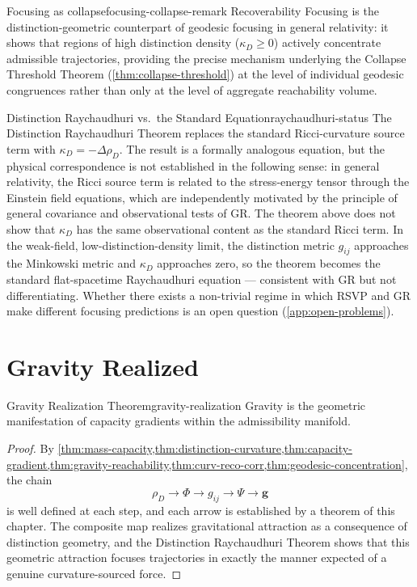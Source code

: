 \documentclass[12pt,twoside,openright]{book}
\begin{document}
\begin{remark}{Focusing as collapse}{focusing-collapse-remark}
  Recoverability Focusing is the distinction-geometric
  counterpart of geodesic focusing in general relativity: it
  shows that regions of high distinction density
  ($\kappa_D \ge 0$) actively concentrate admissible
  trajectories, providing the precise mechanism underlying
  the Collapse Threshold Theorem
  (\cref{thm:collapse-threshold}) at the level of individual
  geodesic congruences rather than only at the level of
  aggregate reachability volume.
\end{remark}

\begin{remark}{Distinction Raychaudhuri vs.\ the Standard
  Equation}{raychaudhuri-status}
  The Distinction Raychaudhuri Theorem replaces the
  standard Ricci-curvature source term with
  $\kappa_D = -\Delta\rho_D$. The result is a formally
  analogous equation, but the physical correspondence
  is not established in the following sense: in general
  relativity, the Ricci source term is related to the
  stress-energy tensor through the Einstein field equations,
  which are independently motivated by the principle of
  general covariance and observational tests of GR. The
  theorem above does not show that $\kappa_D$ has the same
  observational content as the standard Ricci term. In the
  weak-field, low-distinction-density limit, the
  distinction metric $g_{ij}$ approaches the Minkowski
  metric and $\kappa_D$ approaches zero, so the theorem
  becomes the standard flat-spacetime Raychaudhuri equation
  --- consistent with GR but not differentiating.
  Whether there exists a non-trivial regime in which RSVP
  and GR make different focusing predictions is an open
  question (\cref{app:open-problems}).
\end{remark}

\section{Gravity Realized}
\label{sec:ch17-realization}

\begin{theorem}{Gravity Realization Theorem}{gravity-realization}
  Gravity is the geometric manifestation of capacity
  gradients within the admissibility manifold.
\end{theorem}

\begin{proof}
  By \cref{thm:mass-capacity,thm:distinction-curvature,thm:capacity-gradient,thm:gravity-reachability,thm:curv-reco-corr,thm:geodesic-concentration},
  the chain
  \[
    \rho_D \to \Phi \to g_{ij} \to \Psi \to \mathbf{g}
  \]
  is well defined at each step, and each arrow is
  established by a theorem of this chapter. The composite
  map realizes gravitational attraction as a consequence
  of distinction geometry, and the Distinction Raychaudhuri
  Theorem shows that this geometric attraction focuses
  trajectories in exactly the manner expected of a genuine
  curvature-sourced force.
\end{proof}
\end{document}
